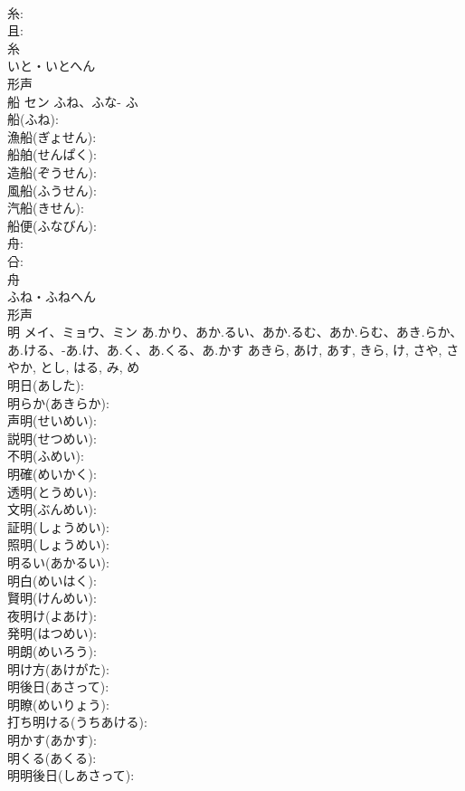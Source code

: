 \documentclass[8pt]{extreport}
\begin{document}
\begin{CJK}{UTF8}{min}
\\	糸: 
\\	且: 
\\	糸	
\\	いと・いとへん	
\\	形声 
\\	船	セン	ふね、ふな-	ふ	
\\	船(ふね): 
\\	漁船(ぎょせん): 
\\	船舶(せんぱく): 
\\	造船(ぞうせん): 
\\	風船(ふうせん): 
\\	汽船(きせん): 
\\	船便(ふなびん): 
\\	舟: 
\\	㕣: 
\\	舟	
\\	ふね・ふねへん	
\\	形声 
\\	明	メイ、ミョウ、ミン	あ.かり、あか.るい、あか.るむ、あか.らむ、あき.らか、あ.ける、-あ.け、あ.く、あ.くる、あ.かす	あきら, あけ, あす, きら, け, さや, さやか, とし, はる, み, め	
\\	明日(あした): 
\\	明らか(あきらか): 
\\	声明(せいめい): 
\\	説明(せつめい): 
\\	不明(ふめい): 
\\	明確(めいかく): 
\\	透明(とうめい): 
\\	文明(ぶんめい): 
\\	証明(しょうめい): 
\\	照明(しょうめい): 
\\	明るい(あかるい): 
\\	明白(めいはく): 
\\	賢明(けんめい): 
\\	夜明け(よあけ): 
\\	発明(はつめい): 
\\	明朗(めいろう): 
\\	明け方(あけがた): 
\\	明後日(あさって): 
\\	明瞭(めいりょう): 
\\	打ち明ける(うちあける): 
\\	明かす(あかす): 
\\	明くる(あくる): 
\\	明明後日(しあさって): 

\end{CJK}
\end{document}
